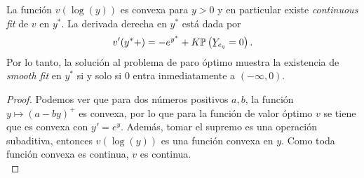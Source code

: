 \begin{theorem}
La función $v(\log(y))$ es convexa para $y > 0$ y en particular existe \textit{continuous fit} de $v$ en $y^{*}$. La derivada derecha en $y^{*}$ está dada por 
\begin{align*}
v'(y^{*} +) = - e^{y^{*}} + K \mathbb{P} \left( \ubar{Y}_{e_q} = 0 \right).
\end{align*}
Por lo tanto, la solución al problema de paro óptimo muestra la existencia de \textit{smooth fit} en $y^{*}$ si y solo si $0$ entra inmediatamente a $(- \infty, 0)$.
\end{theorem}
\begin{proof}
Podemos ver que para dos números positivos $a, b$, la función $y \mapsto (a - by)^{+}$ es convexa, por lo que para la función de valor óptimo $v$ se tiene que es convexa con $y' = e^{y}$. Además, tomar el supremo es una operación subaditiva, entonces $v(\log(y))$ es una función convexa en $y$. Como toda función convexa es continua, $v$ es continua. \\


\end{proof}
